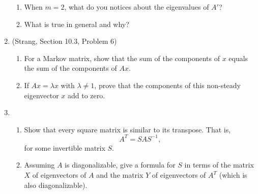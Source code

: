 \documentclass[11pt]{article}
\begin{document}
\begin{enumerate}
\begin{enumerate}
\item When $m=2$, what do you notices about the eigenvalues of $A'$?
\item What is true in general and why?
\end{enumerate}

\item (Strang, Section 10.3, Problem 6)  
\begin{enumerate}
\item For a Markov matrix, show that the sum of the components of $x$ equals the sum of the components of $Ax$.
\item If $Ax =  \lambda x$ with $\lambda \neq 1$, prove that the components of this non-steady eigenvector $x$ add to zero.
\end{enumerate}


\item 

\begin{enumerate}
\item Show that every square matrix is similar to its transpose.  That is, 
\[A^T=SAS^{-1}, \] 
for some invertible matrix $S$.
\item Assuming $A$ is diagonalizable, give a formula for $S$ in terms of the matrix $X$ of eigenvectors of $A$ and the matrix $Y$ of eigenvectors of $A^T$ (which is also diagonalizable).
\end{enumerate}


\end{enumerate}
\end{document}

